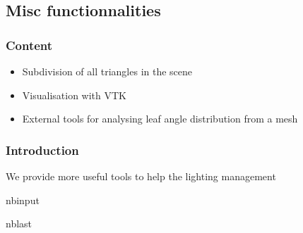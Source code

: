 \documentclass[letterpaper,10pt,english]{sphinxmanual}
\begin{document}
\subsection{Misc functionnalities}
\label{\detokenize{misc_functionnalities:Misc-functionnalities}}\label{\detokenize{misc_functionnalities::doc}}

\subsubsection{Content}
\label{\detokenize{misc_functionnalities:Content}}\begin{itemize}
\item {} 
\sphinxAtStartPar
Subdivision of all triangles in the scene

\item {} 
\sphinxAtStartPar
Visualisation with VTK

\item {} 
\sphinxAtStartPar
External tools for analysing leaf angle distribution from a mesh

\end{itemize}


\subsubsection{Introduction}
\label{\detokenize{misc_functionnalities:Introduction}}
\sphinxAtStartPar
We provide more useful tools to help the lighting management

\begin{sphinxuseclass}{nbinput}
\begin{sphinxuseclass}{nblast}
{
\begin{sphinxVerbatim}[commandchars=\\\{\}]
\llap{\color{nbsphinxin}[1]:\,\hspace{\fboxrule}\hspace{\fboxsep}} 
   
   
   
\end{sphinxVerbatim}
}

\end{sphinxuseclass}
\end{sphinxuseclass}
\end{document}

